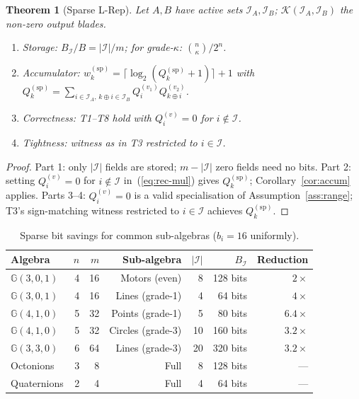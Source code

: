 \documentclass[11pt,a4paper]{article}
\theoremstyle{definition}
\theoremstyle{plain}
\newtheorem{theorem}{Theorem}[section]
\theoremstyle{remark}
\newcommand{\GA}{\mathbb{G}}
\begin{document}
\begin{theorem}[Sparse L-Rep]
\label{thm:sparse}
Let $A,B$ have active sets $\mathcal{I}_A,\mathcal{I}_B$;
$\mathcal{K}(\mathcal{I}_A,\mathcal{I}_B)$ the non-zero output blades.
\begin{enumerate}
  \item \emph{Storage}: $B_{\mathcal{I}}/B=|\mathcal{I}|/m$;
        for grade-$\kappa$: $\binom{n}{\kappa}/2^n$.
  \item \emph{Accumulator}: $w_k^{(\mathrm{sp})}=\lceil\log_2(Q_k^{(\mathrm{sp})}+1)\rceil+1$
        with $Q_k^{(\mathrm{sp})}=\sum_{i\in\mathcal{I}_A,\,k\oplus i\in\mathcal{I}_B}
        Q_i^{(v_1)}Q_{k\oplus i}^{(v_2)}$.
  \item \emph{Correctness}: T1--T8 hold with $Q_i^{(v)}=0$ for $i\notin\mathcal{I}$.
  \item \emph{Tightness}: witness as in T3 restricted to $i\in\mathcal{I}$.
\end{enumerate}
\end{theorem}

\begin{proof}
Part 1: only $|\mathcal{I}|$ fields are stored; $m-|\mathcal{I}|$ zero fields need no bits.
Part 2: setting $Q_i^{(v)}=0$ for $i\notin\mathcal{I}$ in~(\ref{eq:rec-mul})
gives $Q_k^{(\mathrm{sp})}$; Corollary~\ref{cor:accum} applies.
Parts 3--4: $Q_i^{(v)}=0$ is a valid specialisation of Assumption~\ref{ass:range};
T3's sign-matching witness restricted to $i\in\mathcal{I}$ achieves $Q_k^{(\mathrm{sp})}$.
\end{proof}

\begin{table}[h]
\centering
\caption{Sparse bit savings for common sub-algebras ($b_i=16$ uniformly).}
\label{tab:sparse}
\begin{tabular}{lrrrrrr}
\toprule
Algebra & $n$ & $m$ & Sub-algebra & $|\mathcal{I}|$ & $B_\mathcal{I}$ & Reduction \\
\midrule
$\GA(3,0,1)$ & 4 & 16 & Motors (even) & 8 & 128 bits & $2\times$ \\
$\GA(3,0,1)$ & 4 & 16 & Lines (grade-1) & 4 & 64 bits & $4\times$ \\
$\GA(4,1,0)$ & 5 & 32 & Points (grade-1) & 5 & 80 bits & $6.4\times$ \\
$\GA(4,1,0)$ & 5 & 32 & Circles (grade-3) & 10 & 160 bits & $3.2\times$ \\
$\GA(3,3,0)$ & 6 & 64 & Lines (grade-3) & 20 & 320 bits & $3.2\times$ \\
Octonions & 3 & 8 & Full & 8 & 128 bits & --- \\
Quaternions & 2 & 4 & Full & 4 & 64 bits & --- \\
\bottomrule
\end{tabular}
\end{table}
\end{document}
